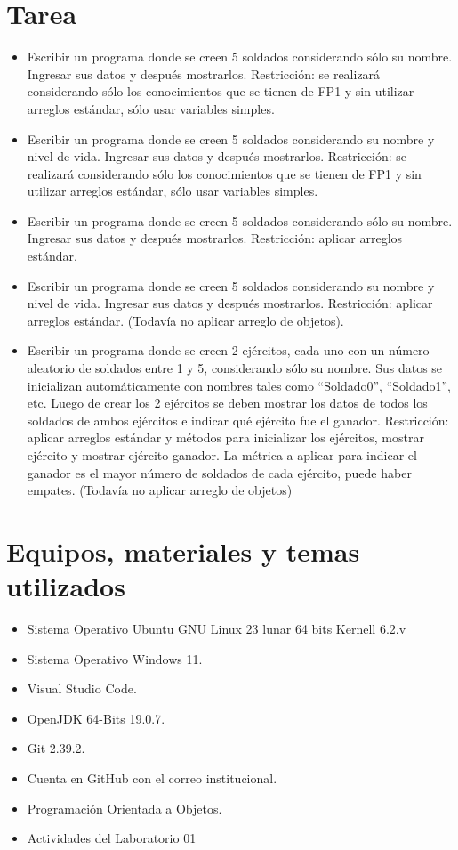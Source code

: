 \documentclass{article}
\begin{document}
	\section{Tarea}
	\begin{itemize}		
		\item Escribir un programa donde se creen 5 soldados considerando sólo su nombre. Ingresar sus datos y
		después mostrarlos.
		Restricción: se realizará considerando sólo los conocimientos que se tienen de FP1 y sin utilizar arreglos estándar,
		sólo usar variables simples.
		\item Escribir un programa donde se creen 5 soldados considerando su nombre y nivel de vida. Ingresar sus
		datos y después mostrarlos.
		Restricción: se realizará considerando sólo los conocimientos que se tienen de FP1 y sin utilizar arreglos estándar,
		sólo usar variables simples.
		\item Escribir un programa donde se creen 5 soldados considerando sólo su nombre. Ingresar sus datos y
		después mostrarlos.
		Restricción: aplicar arreglos estándar.
		\item Escribir un programa donde se creen 5 soldados considerando su nombre y nivel de vida. Ingresar sus
		datos y después mostrarlos.
		Restricción: aplicar arreglos estándar. (Todavía no aplicar arreglo de objetos).
		\item Escribir un programa donde se creen 2 ejércitos, cada uno con un número aleatorio de soldados entre
		1 y 5, considerando sólo su nombre. Sus datos se inicializan automáticamente con nombres tales como “Soldado0”,
		“Soldado1”, etc. Luego de crear los 2 ejércitos se deben mostrar los datos de todos los soldados de ambos ejércitos
		e indicar qué ejército fue el ganador.
		Restricción: aplicar arreglos estándar y métodos para inicializar los ejércitos, mostrar ejército y mostrar ejército
		ganador. La métrica a aplicar para indicar el ganador es el mayor número de soldados de cada ejército, puede
		haber empates. (Todavía no aplicar arreglo de objetos)
	\end{itemize}
		
	\section{Equipos, materiales y temas utilizados}
	\begin{itemize}
		\item Sistema Operativo Ubuntu GNU Linux 23 lunar 64 bits Kernell 6.2.v
		\item Sistema Operativo Windows 11.
		\item Visual Studio Code.
		\item OpenJDK 64-Bits 19.0.7.
		\item Git 2.39.2.
		\item Cuenta en GitHub con el correo institucional.
		\item Programación Orientada a Objetos.
		\item Actividades del Laboratorio 01	
	\end{itemize}
	
\end{document}

